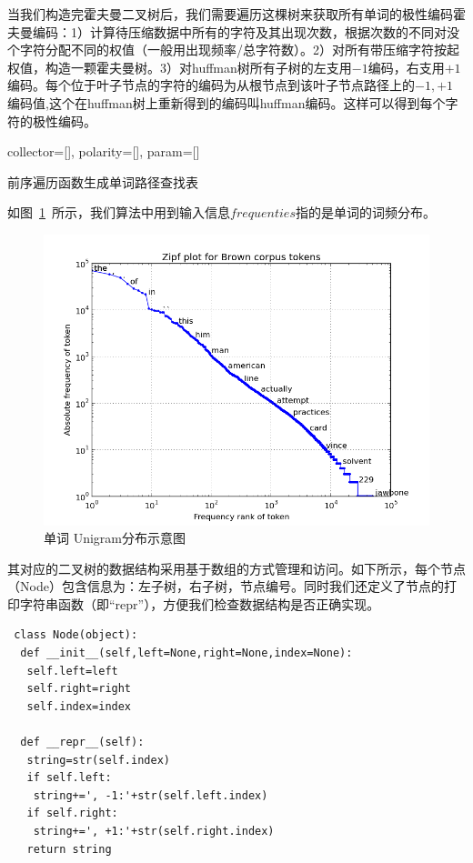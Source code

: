当我们构造完霍夫曼二叉树后，我们需要遍历这棵树来获取所有单词的极性编码霍夫曼编码：1）计算待压缩数据中所有的字符及其出现次数，根据次数的不同对没个字符分配不同的权值（一般用出现频率/总字符数）。2）对所有带压缩字符按起权值，构造一颗霍夫曼树。3）对huffman树所有子树的左支用$-1$编码，右支用$+1$编码。每个位于叶子节点的字符的编码为从根节点到该叶子节点路径上的$-1,+1$编码值,这个在huffman树上重新得到的编码叫huffman编码。这样可以得到每个字符的极性编码。
\begin{algorithm}[!ht]
\SetAlgoLined
{}
collector=[], polarity=[], param=[]\;
\caption{前序遍历函数生成单词路径查找表}\label{code:preorder}
\end{algorithm}
如图~\ref{fig:zipf}~所示，我们算法中用到输入信息$frequenties$指的是单词的词频分布。
\begin{figure}[!ht]
  \centering
\includegraphics[width=0.6\linewidth]{./figures/zipf.png}
\caption{单词 Unigram分布示意图}\label{fig:zipf}
\end{figure}

其对应的二叉树的数据结构采用基于数组的方式管理和访问。如下所示，每个节点（Node）包含信息为：左子树，右子树，节点编号。同时我们还定义了节点的打印字符串函数（即``repr''），方便我们检查数据结构是否正确实现。
\begin{verbatim}
 class Node(object):
  def __init__(self,left=None,right=None,index=None):
   self.left=left
   self.right=right
   self.index=index

  def __repr__(self):
   string=str(self.index)
   if self.left:
    string+=', -1:'+str(self.left.index)
   if self.right:
    string+=', +1:'+str(self.right.index)
   return string 
\end{verbatim}


